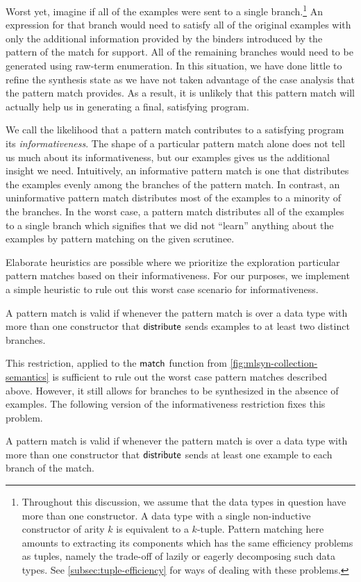 Worst yet, imagine if all of the examples were sent to a single branch.\footnote{%
  Throughout this discussion, we assume that the data types in question have more than one constructor.
  A data type with a single non-inductive constructor of arity $k$ is equivalent to a $k$-tuple.
  Pattern matching here amounts to extracting its components which has the same efficiency problems as tuples, namely the trade-off of lazily or eagerly decomposing such data types.
  See \autoref{subsec:tuple-efficiency} for ways of dealing with these problems.
}
An expression for that branch would need to satisfy all of the original examples with only the additional information provided by the binders introduced by the pattern of the match for support.
All of the remaining branches would need to be generated using raw-term enumeration.
In this situation, we have done little to refine the synthesis state as we have not taken advantage of the case analysis that the pattern match provides.
As a result, it is unlikely that this pattern match will actually help us in generating a final, satisfying program.

We call the likelihood that a pattern match contributes to a satisfying program its \emph{informativeness}.
The shape of a particular pattern match alone does not tell us much about its informativeness, but our examples gives us the additional insight we need.
Intuitively, an informative pattern match is one that distributes the examples evenly among the branches of the pattern match.
In contrast, an uninformative pattern match distributes most of the examples to a minority of the branches.
In the worst case, a pattern match distributes all of the examples to a single branch which signifies that we did not ``learn'' anything about the examples by pattern matching on the given scrutinee.

Elaborate heuristics are possible where we prioritize the exploration particular pattern matches based on their informativeness.
For our purposes, we implement a simple heuristic to rule out this worst case scenario for informativeness.
\begin{definition}
  A pattern match is valid if whenever the pattern match is over a data type with more than one constructor that $\mathsf{distribute}$ sends examples to at least two distinct branches.
\end{definition}
This restriction, applied to the $\mathsf{match}$ function from \autoref{fig:mlsyn-collection-semantics} is sufficient to rule out the worst case pattern matches described above.
However, it still allows for branches to be synthesized in the absence of examples.
The following version of the informativeness restriction fixes this problem.
\begin{definition}
  A pattern match is valid if whenever the pattern match is over a data type with more than one constructor that $\mathsf{distribute}$ sends at least one example to each branch of the match.
\end{definition}

